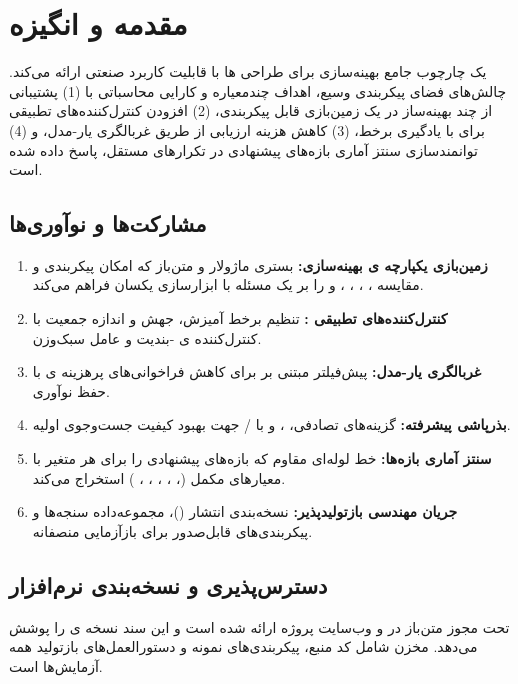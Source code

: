 

\section{مقدمه و انگیزه}
\label{sec:intro}

\softwareName{} یک چارچوب جامع بهینه‌سازی برای طراحی ‌ها با قابلیت کاربرد صنعتی ارائه می‌کند. چالش‌های فضای پیکربندی وسیع، اهداف چندمعیاره و کارایی محاسباتی با (1) پشتیبانی از چند بهینه‌ساز در یک زمین‌بازی قابل پیکربندی، (2) افزودن کنترل‌کننده‌های تطبیقی برای  با یادگیری برخط، (3) کاهش هزینه ارزیابی از طریق غربالگری یار-مدل، و (4) توانمندسازی سنتز آماری بازه‌های پیشنهادی در تکرارهای مستقل، پاسخ داده شده است.

\subsection{مشارکت‌ها و نوآوری‌ها}
\label{subsec:contributions}
\begin{enumerate}
    \item \textbf{زمین‌بازی یکپارچه ی بهینه‌سازی:} بستری ماژولار و متن‌باز که امکان پیکربندی و مقایسه ، ، ، ،  و  را بر یک مسئله با ابزارسازی یکسان فراهم می‌کند.
    \item \textbf{کنترل‌کننده‌های تطبیقی :} تنظیم برخط آمیزش، جهش و اندازه جمعیت با کنترل‌کننده ی -بندیت و عامل  سبک‌وزن.
    \item \textbf{غربالگری یار-مدل:} پیش‌فیلتر مبتنی بر  برای کاهش فراخوانی‌های پرهزینه ی  با حفظ نوآوری.
    \item \textbf{بذرپاشی پیشرفته:} گزینه‌های تصادفی، ،  و  با / جهت بهبود کیفیت جست‌وجوی اولیه.
    \item \textbf{سنتز آماری بازه‌ها:} خط لوله‌ای مقاوم که بازه‌های پیشنهادی را برای هر متغیر  با معیارهای مکمل (، ، ، ، ، ) استخراج می‌کند.
    \item \textbf{جریان مهندسی بازتولیدپذیر:} نسخه‌بندی انتشار (\softwareVersion{})، مجموعه‌داده سنجه‌ها و پیکربندی‌های قابل‌صدور برای بازآزمایی منصفانه.
\end{enumerate}

\subsection{دسترس‌پذیری و نسخه‌بندی نرم‌افزار}
\label{subsec:availability}
\softwareName{} تحت مجوز متن‌باز در  و وب‌سایت پروژه ارائه شده است و این سند نسخه ی \softwareVersion{} را پوشش می‌دهد. مخزن شامل کد منبع، پیکربندی‌های نمونه و دستورالعمل‌های بازتولید همه آزمایش‌ها است.

